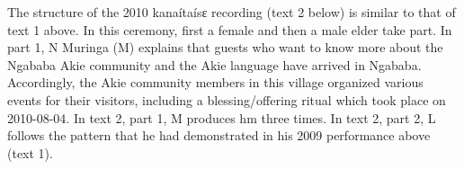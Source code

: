 \documentclass[output=paper,colorlinks,citecolor=brown]{langscibook}
\begin{document}
The structure of the 2010 kanaítaísɛ recording (text 2 below) is similar to that of text 1 above. In this ceremony, first a female and then a male elder take part. In part 1, N Muringa (M) explains that guests who want to know more about the Ngababa Akie community and the Akie language have arrived in Ngababa. Accordingly, the Akie community members in this village organized various events for their visitors, including a blessing/offering ritual which took place on 2010-08-04. 
In text 2, part 1, M produces hm three times. In text 2, part 2, L follows the pattern that he had demonstrated in his 2009 performance above (text 1).



\end{document}
